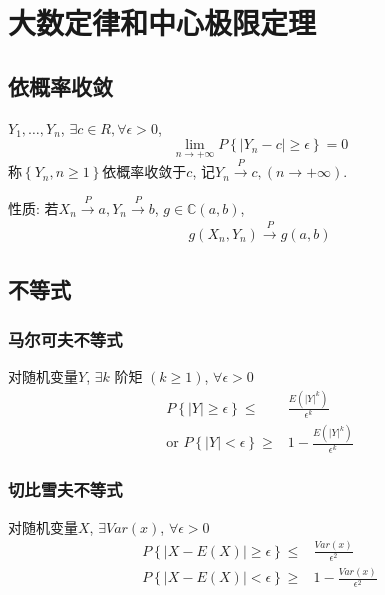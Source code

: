 \newpage
\section{大数定律和中心极限定理}
\subsection{依概率收敛}
\begin{definition}
    $Y_1,\dots,Y_n$, $\exists c\in R, \forall \epsilon>0$,
    \[\lim_{n\rightarrow +\infty}P\left\{\left| Y_n-c \right|\ge \epsilon \right\}=0 \]
    称$\left\{Y_n,n\ge 1\right\}$依概率收敛于$c$, 记$Y_n \overset{P}{\longrightarrow}c, (n\rightarrow +\infty)$. 
\end{definition}

性质: 若$X_n \overset{P}{\longrightarrow}a, Y_n \overset{P}{\longrightarrow}b$, $g\in \mathbb{C}(a,b)$,
\begin{align*}
    g(X_n,Y_n) \overset{P}{\longrightarrow} g(a,b)
\end{align*}

\subsection{不等式}
\subsubsection{马尔可夫不等式}
\begin{theorem}
    对随机变量$Y$, $\exists k$ 阶矩 $(k\ge 1)$, $\forall \epsilon >0$
    \begin{align*}
        P\left\{|Y|\ge \epsilon\right\}\le& \frac{E\left(|Y|^k\right)}{\epsilon^k}\\
        \text{or }P\left\{|Y|<\epsilon\right\}\ge & 1-\frac{E\left(|Y|^k\right)}{\epsilon^k}
    \end{align*}
\end{theorem}
\subsubsection{切比雪夫不等式}
\begin{theorem}
    对随机变量$X$, $\exists Var(x)$, $\forall \epsilon >0$
    \begin{align*}
        P\left\{|X-E(X)|\ge \epsilon\right\}\le& \frac{Var(x)}{\epsilon^2}\\
        P\left\{|X-E(X)|< \epsilon\right\}\ge& 1-\frac{Var(x)}{\epsilon^2}
    \end{align*}
\end{theorem}

